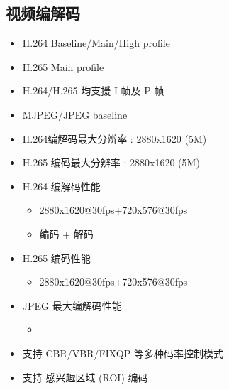 \documentclass[letterpaper,10pt,english]{sphinxmanual}
\begin{document}
\subsection{视频编解码}
\label{\detokenize{contents/system-overview/features:id3}}\begin{itemize}
\item {} 
\sphinxAtStartPar
H.264 Baseline/Main/High profile

\item {} 
\sphinxAtStartPar
H.265 Main profile

\item {} 
\sphinxAtStartPar
H.264/H.265 均支援 I 帧及 P 帧

\item {} 
\sphinxAtStartPar
MJPEG/JPEG baseline

\item {} 
\sphinxAtStartPar
H.264编解码最大分辨率 : 2880x1620 (5M)

\item {} 
\sphinxAtStartPar
H.265 编码最大分辨率 : 2880x1620 (5M)

\item {} 
\sphinxAtStartPar
H.264 编解码性能
\begin{itemize}
\item {} 
\sphinxAtStartPar
2880x1620@30fps+720x576@30fps

\item {} 
\sphinxAtStartPar
{} 编码 +  解码

\end{itemize}

\item {} 
\sphinxAtStartPar
H.265 编码性能
\begin{itemize}
\item {} 
\sphinxAtStartPar
2880x1620@30fps+720x576@30fps

\end{itemize}

\item {} 
\sphinxAtStartPar
JPEG 最大编解码性能
\begin{itemize}
\item {} 
\sphinxAtStartPar
{}

\end{itemize}

\item {} 
\sphinxAtStartPar
支持 CBR/VBR/FIXQP 等多种码率控制模式

\item {} 
\sphinxAtStartPar
支持 感兴趣区域 (ROI) 编码

\end{itemize}
\end{document}
